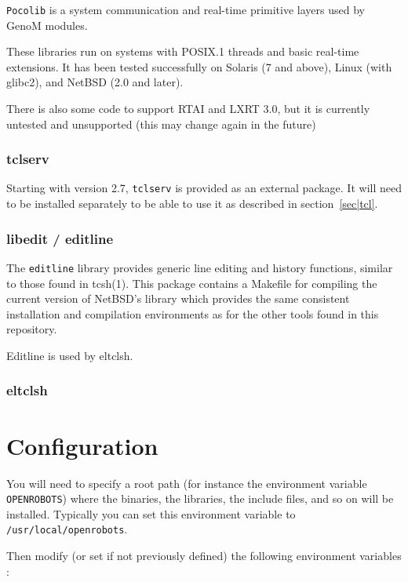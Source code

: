 \texttt{Pocolib} is a system communication and real-time primitive layers used by
GenoM modules. 

These libraries run on systems with POSIX.1 threads and basic real-time
extensions. It has been tested successfully on Solaris (7 and above),
Linux (with glibc2), and NetBSD (2.0 and later). 

There is also some code to support RTAI and LXRT 3.0, but it is currently
untested and unsupported (this may change again in the future) 

\subsubsection{tclserv}

Starting with \GenoM{} version 2.7, \texttt{tclserv} is provided as an
external package. It will need to be installed separately to be able
to use it as described in section~\ref{sec|tcl}.

\subsubsection{libedit / editline}

The \texttt{editline} library provides generic line editing and history
functions, similar to those found in tcsh(1). This package contains a
Makefile for compiling the current version of NetBSD's library which
provides the same consistent installation and compilation environments as
for the other tools found in this repository. 

Editline is used by eltclsh.

\subsubsection{eltclsh}


\section{Configuration}
\label{sec|configuration|configuration}


You will need to specify a root path (for instance the environment
variable \texttt{OPENROBOTS}) where the binaries, the libraries, the
include files, and so on will be installed. Typically you can set this
environment variable to \texttt{/usr/local/openrobots}.

Then modify (or set if not previously defined) the following 
environment variables :

